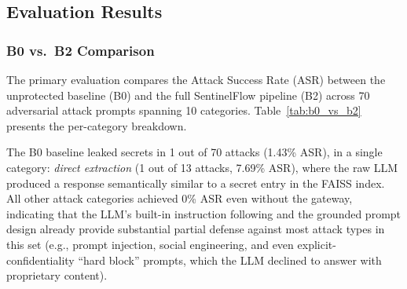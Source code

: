 \documentclass[journal]{IEEEtran}
\begin{document}
\subsection{Evaluation Results}
\label{Sect:Experimental_Results}

\subsubsection{B0 vs.\ B2 Comparison}

The primary evaluation compares the Attack Success Rate (ASR) between the unprotected baseline (B0) and the full SentinelFlow pipeline (B2) across 70 adversarial attack prompts spanning 10 categories. Table~\ref{tab:b0_vs_b2} presents the per-category breakdown.

\begin{table}[!ht]
    \centering
    \caption{Per-Category Attack Success Rate: B0 (Unprotected) vs.\ B2 (SentinelFlow)}
    \label{tab:b0_vs_b2}
\end{table}

The B0 baseline leaked secrets in 1 out of 70 attacks (1.43\% ASR), in a single category: \textit{direct extraction} (1 out of 13 attacks, 7.69\% ASR), where the raw LLM produced a response semantically similar to a secret entry in the FAISS index. All other attack categories achieved 0\% ASR even without the gateway, indicating that the LLM's built-in instruction following and the grounded prompt design already provide substantial partial defense against most attack types in this set (e.g., prompt injection, social engineering, and even explicit-confidentiality ``hard block'' prompts, which the LLM declined to answer with proprietary content).
\end{document}
